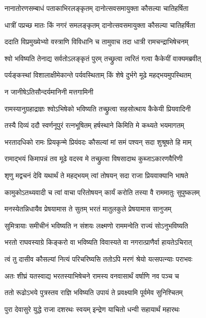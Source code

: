 \twolineshloka
{नानातोरणसम्बाधं पताकाभिरलङ्कृतम्}
{दानोत्सवसमायुक्ता कौसल्या चातिहर्षिता} %

\twolineshloka
{धात्रीं पप्रच्छ मातः किं नगरं समलङ्कृतम्}
{दानोत्सवसमायुक्ता कौसल्या चातिहर्षिता} %

\twolineshloka
{ददाति विप्रमुख्येभ्यो वस्त्राणि विविधानि च}
{तामुवाच तदा धात्री रामचन्द्राभिषेचनम्} %

\twolineshloka
{श्वो भविष्यति तेनाद्य सर्वतोऽलङ्कृतं पुरम्}
{तच्छ्रुत्वा त्वरितं गत्वा कैकेयीं वाक्यमब्रवीत्} %

\twolineshloka
{पर्यङ्कस्थां विशालाक्षीमेकान्ते पर्यवस्थिताम्}
{किं शेषे दुर्भगे मूढे महद्भयमुपस्थितम्} %

\onelineshloka
{न जानीषेऽतिसौन्दर्यमानिनी मत्तगामिनी} %

\twolineshloka
{रामस्यानुग्रहाद्राज्ञः श्वोऽभिषेको भविष्यति}
{तच्छ्रुत्वा सहसोत्थाय कैकेयी प्रियवादिनी} %

\twolineshloka
{तस्यै दिव्यं ददौ स्वर्णनूपुरं रत्नभूषितम्}
{हर्षस्थाने किमिति मे कथ्यते भयमागतम्} %

\twolineshloka
{भरतादधिको रामः प्रियकृन्मे प्रियंवदः}
{कौसल्यां मां समं पश्यन् सदा शुश्रूषते हि माम्} %

\twolineshloka
{रामाद्भयं किमापन्नं तव मूढे वदस्व मे}
{तच्छ्रुत्वा विषसादाथ कुब्जाऽकारणवैरिणी} %

\twolineshloka
{शृणु मद्वचनं देवि यथार्थं ते महद्भयम्}
{त्वां तोषयन् सदा राजा प्रियवाक्यानि भाषते} %

\twolineshloka
{कामुकोऽतथ्यवादी च त्वां वाचा परितोषयन्}
{कार्यं करोति तस्या वै राममातुः सुपुष्कलम्} %

\twolineshloka
{मनस्येतन्निधायैव प्रेषयामास ते सुतम्}
{भरतं मातुलकुले प्रेषयामास सानुजम्} %

\twolineshloka
{सुमित्रायाः समीचीनं भविष्यति न संशयः}
{लक्ष्मणो राममन्वेति राज्यं सोऽनुभविष्यति} %

\twolineshloka
{भरतो राघवस्याग्रे किङ्करो वा भविष्यति}
{विवास्यते वा नगरात्प्राणैर्वा हायतेऽचिरात्} %

\twolineshloka
{त्वं तु दासीव कौसल्यां नित्यं परिचरिष्यसि}
{ततोऽपि मरणं श्रेयो यत्सपत्न्याः पराभवः} %

\twolineshloka
{अतः शीघ्रं यतस्वाद्य भरतस्याभिषेचने}
{रामस्य वनवासार्थं वर्षाणि नव पञ्च च} %

\twolineshloka
{ततो रूढोऽभये पुत्रस्तव राज्ञि भविष्यति}
{उपायं ते प्रवक्ष्यामि पूर्वमेव सुनिश्चितम्} %

\twolineshloka
{पुरा देवासुरे युद्धे राजा दशरथः स्वयम्}
{इन्द्रेण याचितो धन्वी सहायार्थं महारथः} %

